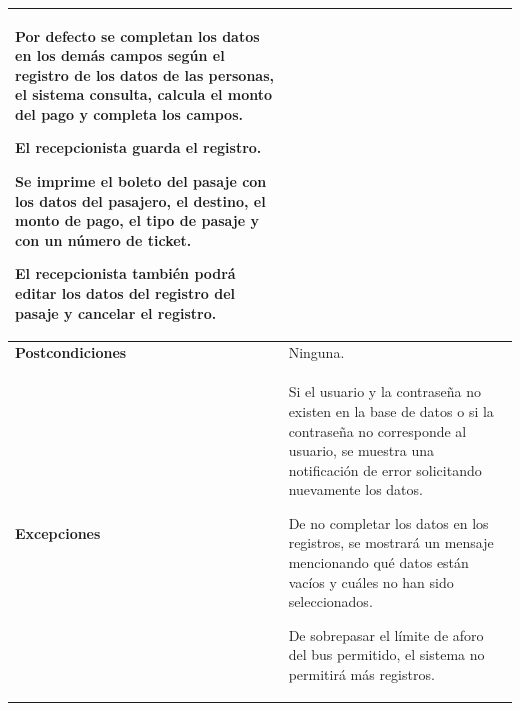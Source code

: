 \begin{longtable}{m{4cm} m{10.5cm}}
		Por defecto se completan los datos en los demás campos según el registro de los datos de las personas, el sistema consulta, calcula el monto del pago y completa los campos.
		
		El recepcionista guarda el registro.
		
		Se imprime el boleto del pasaje con los datos del pasajero, el destino, el monto de pago, el tipo de pasaje y con un número de ticket.
		
		El recepcionista también podrá editar los datos del registro del pasaje y cancelar el registro. \\ \hline
		\textbf{Postcondiciones} & Ninguna.\\ \hline
		\textbf{Excepciones} & Si el usuario y la contraseña no existen en la base de datos o si la contraseña no corresponde al usuario, se muestra una notificación de error solicitando nuevamente los datos.
		
		De no completar los datos en los registros, se mostrará un mensaje mencionando qué datos están vacíos y cuáles no han sido seleccionados.
		
		De sobrepasar el límite de aforo del bus permitido, el sistema no permitirá más registros. \\
	\end{longtable}
	
	\endgroup 
	\vspace{-6pt}  %
	
	\begingroup
	\onehalfspacing
	
